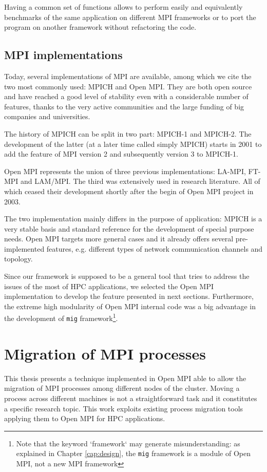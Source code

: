 Having a common set of functions allows to perform easily and equivalently
benchmarks of the same application on different MPI frameworks or to port
the program on another framework without refactoring the code.

\subsection{MPI implementations}

Today, several implementations of MPI are available, among which we cite
the two most commonly used: MPICH\cite{karonis2003mpich} and Open
MPI\cite{gabriel2004open}. They are both open source and have reached a good
level of stability even with a considerable number of features, thanks to the
very active communities and the large funding of big companies and
universities.

The history of MPICH can be split in two part: MPICH-1 and MPICH-2. The
development of the latter (at a later time called simply MPICH) starts in
2001 to add the feature of MPI version 2 and subsequently version 3 to MPICH-1.

Open MPI represents the union of three
previous implementations: LA-MPI, FT-MPI and LAM/MPI. The third 
was extensively used in research literature. All of which ceased their
development shortly after the begin of Open MPI project in 2003.

The two implementation mainly differs in the purpose of application: MPICH is
a very stable basis and standard reference for the development of special
purpose needs. Open MPI targets more general cases and it already offers
several pre-implemented features, e.g. different types of network
communication channels and topology.

Since our framework is supposed to be a general tool that tries to address
the issues of the most of HPC applications, we selected the Open MPI
implementation to develop the feature presented in next sections. Furthermore,
the extreme high modularity of Open MPI internal code was a big advantage in
the development of \texttt{mig} framework\footnote{Note that the keyword
`framework` may generate misunderstanding: as explained in Chapter
\ref{cap:design}, the \texttt{mig} framework is a module of Open MPI, not a new
MPI framework}.


\section{Migration of MPI processes}
This thesis presents a technique implemented in Open MPI able to allow the
migration of MPI processes among different nodes of the cluster. Moving a
process across different machines is not a straightforward task and
it constitutes a specific research topic. This work exploits existing
process migration tools applying them to Open MPI for HPC applications.

